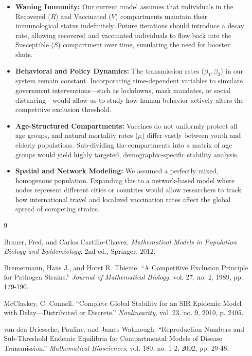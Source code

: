 \documentclass[12pt]{article}
\begin{document}
\begin{itemize}
    \item \textbf{Waning Immunity:} Our current model assumes that individuals in the Recovered ($R$) and Vaccinated ($V$) compartments maintain their immunological status indefinitely. Future iterations should introduce a decay rate, allowing recovered and vaccinated individuals to flow back into the Susceptible ($S$) compartment over time, simulating the need for booster shots.
    \item \textbf{Behavioral and Policy Dynamics:} The transmission rates ($\beta_1, \beta_2$) in our system remain constant. Incorporating time-dependent variables to simulate government interventions—such as lockdowns, mask mandates, or social distancing—would allow us to study how human behavior actively alters the competitive exclusion threshold.
    \item \textbf{Age-Structured Compartments:} Vaccines do not uniformly protect all age groups, and natural mortality rates ($\mu$) differ vastly between youth and elderly populations. Sub-dividing the compartments into a matrix of age groups would yield highly targeted, demographic-specific stability analysis.
    \item \textbf{Spatial and Network Modeling:} We assumed a perfectly mixed, homogenous population. Expanding this to a network-based model where nodes represent different cities or countries would allow researchers to track how international travel and localized vaccination rates affect the global spread of competing strains.
\end{itemize}

\newpage
\renewcommand{\refname}{Works Cited}
\begin{thebibliography}{9}

 \label{brauer2012}
Brauer, Fred, and Carlos Castillo-Chavez. \textit{Mathematical Models in Population Biology and Epidemiology}. 2nd ed., Springer, 2012.

 \label{bremermann1989}
Bremermann, Hans J., and Horst R. Thieme. ``A Competitive Exclusion Principle for Pathogen Strains.'' \textit{Journal of Mathematical Biology}, vol. 27, no. 2, 1989, pp. 179-190.

 \label{mccluskey2010}
McCluskey, C. Connell. ``Complete Global Stability for an SIR Epidemic Model with Delay---Distributed or Discrete.'' \textit{Nonlinearity}, vol. 23, no. 9, 2010, p. 2405.

 \label{vandendriessche2002}
van den Driessche, Pauline, and James Watmough. ``Reproduction Numbers and Sub-Threshold Endemic Equilibria for Compartmental Models of Disease Transmission.'' \textit{Mathematical Biosciences}, vol. 180, no. 1-2, 2002, pp. 29-48.

\end{thebibliography}
\end{document}
